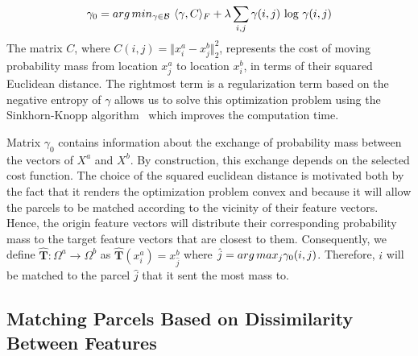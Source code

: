 \begin{equation}
\gamma_0 = arg\,min_{\gamma \in \mathcal{B}} \textnormal{~} \langle \gamma,C \rangle_F + \lambda \sum_{i,j} \gamma(i,j) \textnormal{~log~} \gamma(i,j)
\end{equation}
The matrix $C$, where $C(i,j) = \Vert x^a_i - x^b_j \Vert^2_2$, represents the cost of moving probability mass from location $x^a_j$ to location $x^b_i$, in terms of their squared Euclidean distance. The rightmost term is a regularization term based on the negative entropy of $\gamma$ allows us to solve this optimization problem using the Sinkhorn-Knopp algorithm~\cite{cuturi_sh} which improves the computation time.

Matrix $\gamma_0$ contains information about the exchange of probability mass between the vectors of $X^a$ and $X^b$. By construction, this exchange depends on the selected cost function. The choice of the squared euclidean distance is motivated both by the fact that it renders the optimization problem convex and because it will allow the parcels to be matched according to the vicinity of their feature vectors. Hence, the origin feature vectors will distribute their corresponding probability mass to the target feature vectors that are closest to them. Consequently, we define $\hat{\mathbf{T}}:\Omega^a \rightarrow \Omega^b$ as $\hat{\mathbf{T}}(x^a_i) = x^b_{\hat{j}}$ where $\hat{j} = arg\,max_{j} \gamma_0(i,j)$. Therefore, $i$ will be matched to the parcel $\hat{j}$ that it sent the most mass to.

\subsection{Matching Parcels Based on Dissimilarity Between Features}
\label{sec:others}

